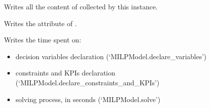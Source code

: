 \documentclass[letterpaper,10pt,english]{sphinxmanual}
\begin{document}
\begin{fulllineitems}
\begin{fulllineitems}
\end{fulllineitems}


\begin{fulllineitems}
\label{\detokenize{generated/tamos.data_IO.ResultsExport:tamos.data_IO.ResultsExport.write_all}}
\pysigstartsignatures
{}
\pysigstopsignatures
\sphinxAtStartPar
Writes all the content of  collected by this instance.

\end{fulllineitems}


\begin{fulllineitems}
\label{\detokenize{generated/tamos.data_IO.ResultsExport:tamos.data_IO.ResultsExport.write_description}}
\pysigstartsignatures
{}
\pysigstopsignatures
\sphinxAtStartPar
Writes the  attribute of .

\end{fulllineitems}


\begin{fulllineitems}
\label{\detokenize{generated/tamos.data_IO.ResultsExport:tamos.data_IO.ResultsExport.write_exec_time}}
\pysigstartsignatures
{}
\pysigstopsignatures
\sphinxAtStartPar
Writes the time spent on:
\begin{itemize}
\item {} 
\sphinxAtStartPar
decision variables declaration (‘MILPModel.declare\_variables’)

\item {} 
\sphinxAtStartPar
constraints and KPIs declaration (‘MILPModel.declare\_constraints\_and\_KPIs’)

\item {} 
\sphinxAtStartPar
solving process, in seconds (‘MILPModel.solve’)


\end{itemize}
\end{fulllineitems}
\end{fulllineitems}
\end{document}
